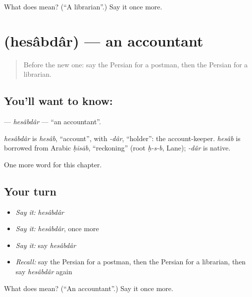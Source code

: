 \begin{tcolorbox}[breakable,colback=teal!4,colframe=teal!35!black,title={Before you move on}]
What does  mean? (\textquotedblleft{}A librarian\textquotedblright{}.) Say it once more.
\end{tcolorbox}
\section[\texorpdfstring{\fa{حسابدار} (hesâbdâr)}{حسابدار (hesâbdâr)}]{ (hesâbdâr) — an accountant}

\label{lesson:FA-C284-hesabdar}



\begin{quote}
Before the new one: say the Persian for a postman, then the Persian for a librarian.
\end{quote}

\subsection*{You'll want to know: }
\textbf{} — \emph{hesâbdâr} — \textquotedblleft{}an accountant\textquotedblright{}.

\begin{cousinweb}
\emph{hesâbdâr} is \emph{hesâb}, \textquotedblleft{}account\textquotedblright{}, with \emph{-dâr}, \textquotedblleft{}holder\textquotedblright{}: the account-keeper. \emph{hesâb} is borrowed from Arabic \emph{ḥisāb}, \textquotedblleft{}reckoning\textquotedblright{} (root \emph{ḥ-s-b}, Lane); \emph{-dâr} is native.
\end{cousinweb}

\begin{grammarlens}[title={What you've built}]
One more word for this chapter.
\end{grammarlens}

\subsection*{Your turn}
\begin{itemize}
\raggedright
  \item \emph{Say it:} \emph{hesâbdâr}
  \item \emph{Say it:} \emph{hesâbdâr}, once more
  \item \emph{Say it:} say \emph{hesâbdâr}
  \item \emph{Recall:} say the Persian for a postman, then the Persian for a librarian, then say \emph{hesâbdâr} again
\end{itemize}

\begin{tcolorbox}[breakable,colback=teal!4,colframe=teal!35!black,title={Before you move on}]
What does  mean? (\textquotedblleft{}An accountant\textquotedblright{}.) Say it once more.
\end{tcolorbox}
